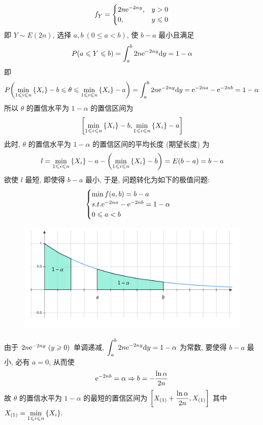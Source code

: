 \begin{solution}
\begin{enumerate}[label=(\arabic{*})]
$$        f_Y=\begin{cases}
            2n\mathrm{e} ^{-2ny}, & y>0\\ 0,& y\leqslant 0
        \end{cases}
        $$
        即 $Y\sim E(2n)$, 选择 $a,b~(0\leqslant a<b)$, 使 $b-a$ 最小且满足 $$
        P(a\leqslant Y\leqslant b)=\int_{a}^{b} 2n\mathrm{e} ^{-2ny} \dd y=1-\alpha
        $$
        即 $$
        P\qty(\min\limits_{1\leqslant i\leqslant n}\qty{X_i}-b\leqslant \theta\leqslant \min\limits_{1\leqslant i\leqslant n}\qty{X_i}-a)=\int_{a}^{b} 2n\mathrm{e} ^{-2ny} \dd y=\mathrm{e} ^{-2na}-\mathrm{e} ^{-2nb}=1-\alpha
        $$
        所以 $\theta$ 的置信水平为 $1-\alpha$ 的置信区间为 $$
        \qty[\min\limits_{1\leqslant i\leqslant n}\qty{X_i}-b,\min\limits_{1\leqslant i\leqslant n}\qty{X_i}-a]
        $$
        此时, $\theta$ 的置信水平为 $1-\alpha$ 的置信区间的平均长度 (期望长度) 为 $$
        l=\min\limits_{1\leqslant i\leqslant n}\qty{X_i}-a-\qty(\min\limits_{1\leqslant i\leqslant n}\qty{X_i}-b)=E(b-a)=b-a
        $$
        欲使 $l$ 最短, 即使得 $b-a$ 最小, 于是, 问题转化为如下的极值问题: $$
        \begin{cases}
            \min f(a,b)=b-a\\ 
            s.t. \mathrm{e} ^{-2na}-\mathrm{e} ^{-2nb}=1-\alpha\\ 
            0\leqslant a<b
        \end{cases}
        $$
        \begin{figure}[H]
            \centering
            \includegraphics[scale=.6]{figures/diagram-20241129.pdf}
            \caption{}
        \end{figure}
        由于 $2n\mathrm{e} ^{-2ny}~(y\geqslant 0)$ 单调递减, $\displaystyle \int_{a}^{b} 2n\mathrm{e}^{-2ny} \dd y=1-\alpha$ 为常数, 要使得 $b-a$ 最小, 必有 $a=0$, 从而使 
        $$
        \mathrm{e} ^{-2nb}=\alpha\Rightarrow b=-\dfrac{\ln \alpha}{2n}
        $$
        故 $\theta$ 的置信水平为 $1-\alpha$ 的最短的置信区间为 $\qty[X_{(1)}+\dfrac{\ln \alpha}{2n},X_{(1)}]$
        其中 $X_{(1)}=\min\limits_{1\leqslant i\leqslant n}\qty{X_i}.$
    \end{enumerate}
\end{solution}